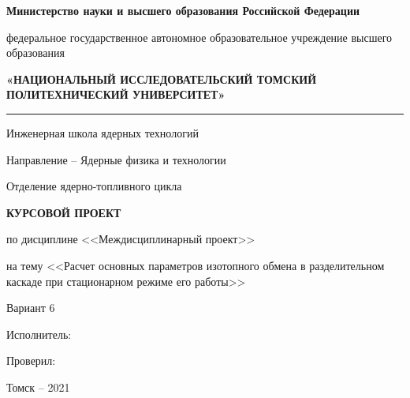 \thispagestyle{empty}
\begin{center}
\textbf{Министерство науки и высшего образования Российской Федерации}

федеральное государственное автономное образовательное учреждение высшего образования

\textbf{«НАЦИОНАЛЬНЫЙ ИССЛЕДОВАТЕЛЬСКИЙ ТОМСКИЙ ПОЛИТЕХНИЧЕСКИЙ УНИВЕРСИТЕТ»}
\noindent\rule{\textwidth}{1pt}
\end{center}

\noindent Инженерная школа ядерных технологий

\noindent Направление -- Ядерные физика и технологии

\noindent Отделение ядерно-топливного цикла

\vspace{5em}
\begin{center}
\textbf{КУРСОВОЙ ПРОЕКТ}

по дисциплине <<Междисциплинарный проект>>

на тему <<Расчет основных параметров изотопного обмена в разделительном
каскаде при стационарном режиме его работы>>

Вариант 6
\end{center}
\vspace{7em}
\noindent Исполнитель:

\vspace{2em}
\noindent Проверил:

\vspace{10em}
\centering Томск -- 2021
\newpage